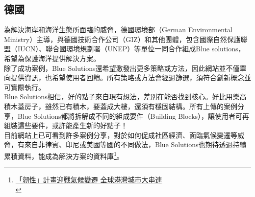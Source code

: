 \documentclass[a4paper,12pt]{article}
\begin{document}
\subsection{德國}
\label{sec:org329bdf3}
為解決海岸和海洋生態所面臨的威脅，德國環境部（German Environmental Ministry）主導，與德國技術合作公司（GIZ）和其他團體，包含國際自然保護聯盟（IUCN）、聯合國環境規劃署（UNEP）等單位一同合作組成Blue solutions，希望為保護海洋提供解決方案。\\

除了成功案例，Blue Solutions還希望激發出更多策略或方法，因此網站並不僅單向提供資訊，也希望使用者回饋。所有策略或方法會經過篩選，須符合創新概念並可實際執行。\\

Blue Solutions相信，好的點子來自現有想法，差別在能否找到核心。好比用樂高積木蓋房子，雖然已有積木，要蓋成大樓，還須有穩固結構。所有上傳的案例分享，Blue Solutions都將拆解成不同的組成要件（Building Blocks），讓使用者可再組裝這些要件，或許能產生新的好點子！\\

目前網站上已可看到許多案例分享，對於如何促成社區經濟、面臨氣候變遷等威脅，有來自菲律賓、印尼或美國等國的不同做法，Blue Solutions也期待透過持續累積資料，能成為解決方案的資料庫\footnote{\href{https://e-info.org.tw/node/103499}{「韌性」計畫迎戰氣候變遷 全球港灣城市大串連 }\\}。\\
\end{document}
